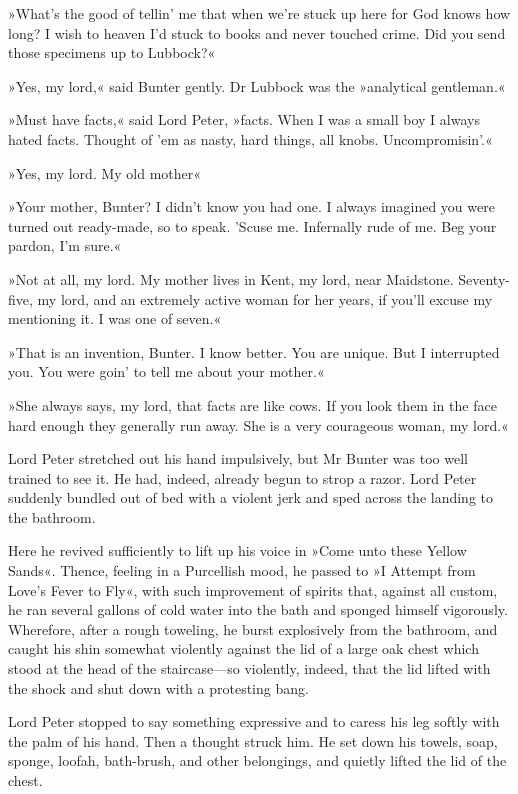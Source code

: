 »What's the good of tellin' me that when we're stuck up here for God knows how long? I wish to heaven I'd stuck to books and never touched crime. Did you send those specimens up to Lubbock?«

»Yes, my lord,« said Bunter gently. Dr Lubbock was the »analytical gentleman.«

»Must have facts,« said Lord Peter, »facts. When I was a small boy I always hated facts. Thought of 'em as nasty, hard things, all knobs.  Uncompromisin'.«

»Yes, my lord. My old mother\longdash«

»Your mother, Bunter? I didn't know you had one. I always imagined you were turned out ready-made, so to speak. 'Scuse me. Infernally rude of me. Beg your pardon, I'm sure.«

»Not at all, my lord. My mother lives in Kent, my lord, near Maidstone.  Seventy-five, my lord, and an extremely active woman for her years, if you'll excuse my mentioning it. I was one of seven.«

»That is an invention, Bunter. I know better. You are unique. But I interrupted you. You were goin' to tell me about your mother.«

»She always says, my lord, that facts are like cows. If you look them in the face hard enough they generally run away. She is a very courageous woman, my lord.«

Lord Peter stretched out his hand impulsively, but Mr Bunter was too well trained to see it. He had, indeed, already begun to strop a razor.  Lord Peter suddenly bundled out of bed with a violent jerk and sped
across the landing to the bathroom.

Here he revived sufficiently to lift up his voice in »Come unto these Yellow Sands«. Thence, feeling in a Purcellish mood, he passed to »I Attempt from Love's Fever to Fly«, with such improvement of spirits that, against all custom, he ran several gallons of cold water into the bath and sponged himself vigorously. Wherefore, after a rough toweling, he burst explosively from the bathroom, and caught his shin somewhat violently against the lid of a large oak chest which stood at the head of the staircase\allowbreak---\allowbreak so violently, indeed, that the lid lifted with the shock and shut down with a protesting bang.

Lord Peter stopped to say something expressive and to caress his leg softly with the palm of his hand. Then a thought struck him. He set down his towels, soap, sponge, loofah, bath-brush, and other belongings, and quietly lifted the lid of the chest.

